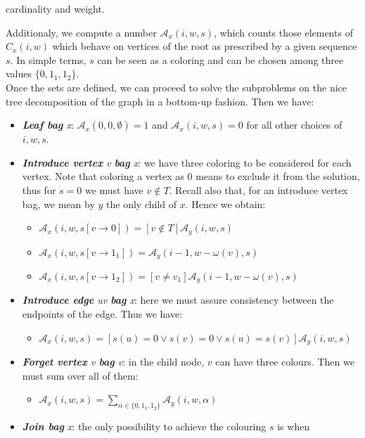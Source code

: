 \documentclass{article}
\theoremstyle{definition}
\theoremstyle{lemma}
\theoremstyle{corollary}
\theoremstyle{theorem}
\begin{document}
\begin{itemize}
\begin{itemize}
		cardinality and weight.
	\end{itemize}
	Additionaly, we compute a number $\mathcal{A}_x(i,w,s)$, which counts those elements of $C_x(i,w)$
	which behave on vertices of the root as prescribed by a given sequence $s$. In simple terms,
	$s$ can be seen as a coloring and can be chosen among three values $\{ 0, 1_1, 1_2 \}$. \\
	Once the sets are defined, we can proceed to solve the subproblems on the nice tree decomposition
	of the graph in a bottom-up fashion. Then we have:
	\begin{itemize}
		\item \emph{\textbf{Leaf bag} x}: $\mathcal{A}_x(0,0,\emptyset) = 1$ and 
		$\mathcal{A}_x(i,w,s) = 0$ for all other choices of $i, w, s$.
		\item \emph{\textbf{Introduce vertex} v \textbf{bag} x}: we have three coloring to be considered
		for each vertex. Note that coloring a vertex as 0 means to exclude it from the solution, thus
		for $s = 0$ we must have $v \not \in T$. Recall also that, for an introduce vertex bag, we mean
		by $y$ the only child of $x$. Hence we obtain:
		\begin{itemize}
			\item $\mathcal{A}_x(i,w,s[v \rightarrow 0]) = [v \not \in T]\mathcal{A}_y(i,w,s)$
			\item $\mathcal{A}_x(i,w,s[v \rightarrow 1_1]) = \mathcal{A}_y(i-1,w-\omega(v),s)$
			\item $\mathcal{A}_x(i,w,s[v \rightarrow 1_2]) = 
			[v \not = v_1]\mathcal{A}_y(i-1,w-\omega(v),s)$
		\end{itemize}
		\item \emph{\textbf{Introduce edge} uv \textbf{bag} x}: here we must assure consistency between
		the endpoints of the edge. Thus we have:
		\begin{itemize}
			\item $\mathcal{A}_x(i,w,s) = [s(u) = 0 \vee s(v) = 0 \vee s(u) = s(v)]
			\mathcal{A}_y(i,w,s)$
		\end{itemize}
		\item \emph{\textbf{Forget vertex} v \textbf{bag} v}: in the child node, $v$ can have three
		colours. Then we must sum over all of them:
		\begin{itemize}
			\item $\mathcal{A}_x(i,w,s) = \sum_{\alpha \in \{0,1_1,1_2\}} \mathcal{A}_y(i,w,\alpha)$
		\end{itemize}
		\item \emph{\textbf{Join bag} x}: the only possibility to achieve the colouring $s$ is when

\end{itemize}
\end{itemize}
\end{document}
